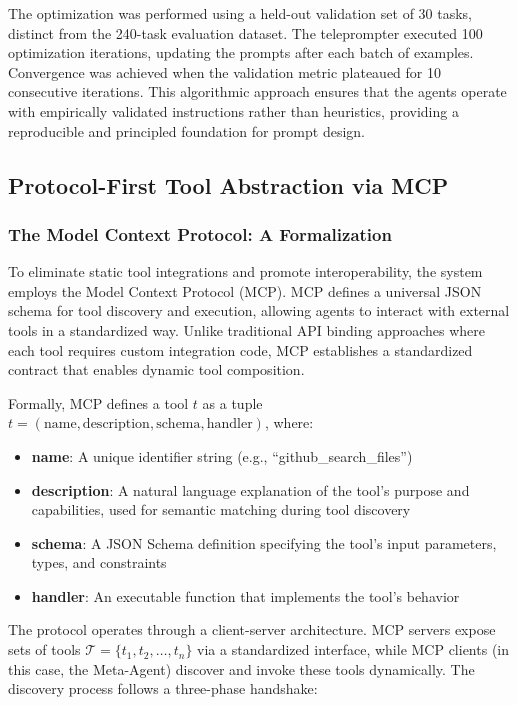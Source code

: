 \documentclass[lettersize,journal]{IEEEtran}
\begin{document}
The optimization was performed using a held-out validation set of 30 tasks, distinct from the 240-task evaluation dataset. The teleprompter executed 100 optimization iterations, updating the prompts after each batch of examples. Convergence was achieved when the validation metric plateaued for 10 consecutive iterations. This algorithmic approach ensures that the agents operate with empirically validated instructions rather than heuristics, providing a reproducible and principled foundation for prompt design.


\subsection{Protocol-First Tool Abstraction via MCP}

\subsubsection{The Model Context Protocol: A Formalization}
To eliminate static tool integrations and promote interoperability, the system employs the Model Context Protocol (MCP). MCP defines a universal JSON schema for tool discovery and execution, allowing agents to interact with external tools in a standardized way. Unlike traditional API binding approaches where each tool requires custom integration code, MCP establishes a standardized contract that enables dynamic tool composition.

Formally, MCP defines a tool $t$ as a tuple $t = (\text{name}, \text{description}, \text{schema}, \text{handler})$, where:
\begin{itemize}
    \item \textbf{name}: A unique identifier string (e.g., ``github\_search\_files'')
    \item \textbf{description}: A natural language explanation of the tool's purpose and capabilities, used for semantic matching during tool discovery
    \item \textbf{schema}: A JSON Schema definition specifying the tool's input parameters, types, and constraints
    \item \textbf{handler}: An executable function that implements the tool's behavior
\end{itemize}

The protocol operates through a client-server architecture. MCP servers expose sets of tools $\mathcal{T} = \{t_1, t_2, \ldots, t_n\}$ via a standardized interface, while MCP clients (in this case, the Meta-Agent) discover and invoke these tools dynamically. The discovery process follows a three-phase handshake:
\end{document}
